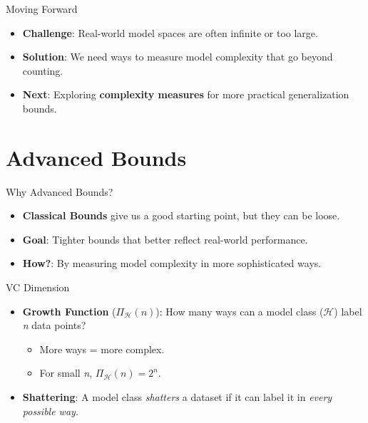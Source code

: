 \documentclass[
  ignorenonframetext,
]{beamer}
\providecommand{\tightlist}{%
  \setlength{\itemsep}{0pt}\setlength{\parskip}{0pt}}\usepackage{longtable,booktabs,array}
\begin{document}
\begin{frame}{Moving Forward}
\label{moving-forward}
\begin{itemize}
\tightlist
\item
  \textbf{Challenge}: Real-world model spaces are often infinite or too
  large.
\item
  \textbf{Solution}: We need ways to measure model complexity that go
  beyond counting.
\item
  \textbf{Next}: Exploring \textbf{complexity measures} for more
  practical generalization bounds.
\end{itemize}
\end{frame}

\section{Advanced Bounds}\label{advanced-bounds}

\begin{frame}{Why Advanced Bounds?}
\label{why-advanced-bounds}
\begin{itemize}
\tightlist
\item
  \textbf{Classical Bounds} give us a good starting point, but they can
  be loose.
\item
  \textbf{Goal}: Tighter bounds that better reflect real-world
  performance.
\item
  \textbf{How?}: By measuring model complexity in more sophisticated
  ways.
\end{itemize}
\end{frame}

\begin{frame}{VC Dimension}
\label{vc-dimension}
\begin{itemize}
\tightlist
\item
  \textbf{Growth Function} (\(\Pi_{\mathcal{H}}(n)\)): How many ways can
  a model class (\(\mathcal{H}\)) label \emph{n} data points?

  \begin{itemize}
  \tightlist
  \item
    More ways = more complex.
  \item
    For small \emph{n}, \(\Pi_{\mathcal{H}}(n)=2^n\).
  \end{itemize}
\item
  \textbf{Shattering}: A model class \emph{shatters} a dataset if it can
  label it in \emph{every possible way}.
\end{itemize}
\end{frame}
\end{document}

